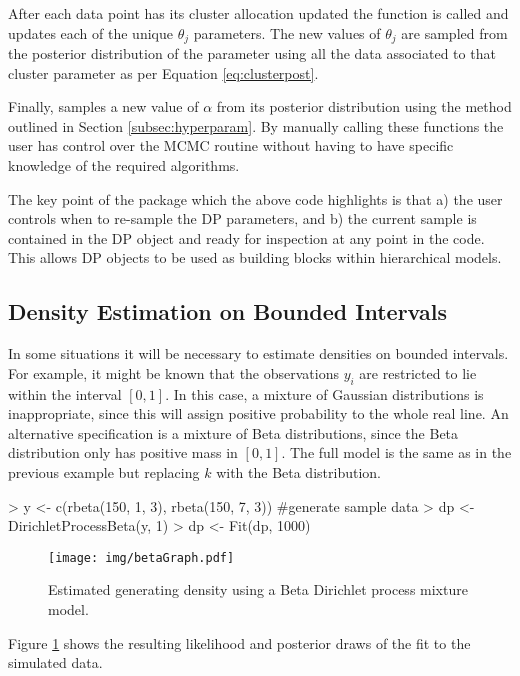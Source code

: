 \documentclass[nojss]{jss}
\begin{document}
After each data point has its cluster allocation updated the function  is called and updates each of the unique $\theta _j$ parameters. The new values of $\theta_j$ are sampled from the posterior distribution of the parameter using all the data associated to that cluster parameter as per Equation \eqref{eq:clusterpost}.

Finally,  samples a new value of $\alpha$ from its posterior distribution using the method outlined in Section \ref{subsec:hyperparam}. By manually calling these functions the user has control over the MCMC routine without having to have specific knowledge of the required algorithms.

The key point of the   package which the above code highlights is that a) the user controls when to re-sample the DP parameters, and b) the current sample is contained in the DP object and ready for inspection at any point in the code. This allows DP objects to be used as building blocks within hierarchical models.

\subsection{Density Estimation on Bounded Intervals}
In some situations it will be necessary to estimate densities on bounded intervals. For example, it might be known that the observations $y_i$ are restricted to lie within the interval $[0,1]$. In this case, a mixture of Gaussian distributions is inappropriate, since this will assign positive probability to the whole real line. An alternative specification is a mixture of Beta distributions, since the Beta distribution only has positive mass in $[0,1]$. The full model is the same as in the previous example but replacing $k$ with the Beta distribution.

\begin{Schunk}
\begin{Sinput}
> y <- c(rbeta(150, 1, 3), rbeta(150, 7, 3)) #generate sample data
> dp <- DirichletProcessBeta(y, 1)
> dp <- Fit(dp, 1000)
\end{Sinput}
\end{Schunk}

\begin{figure}[tb]
	\centering
	\texttt{[image: img/betaGraph.pdf]}
	\caption{Estimated generating density using a Beta Dirichlet process mixture model.}
	\label{fig:densitybounded}
\end{figure}
Figure \ref{fig:densitybounded} shows the resulting likelihood and posterior draws of the fit to the simulated data.
\end{document}
